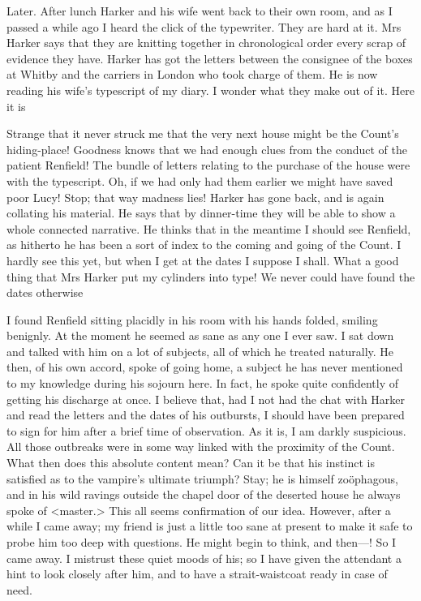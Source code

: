 \begin{diary}{Later.}
After lunch Harker and his wife went back to their own room, and as I passed a while ago I heard the click of the typewriter. They are hard at it. Mrs Harker says that they are knitting together in chronological order every scrap of evidence they have. Harker has got the letters between the consignee of the boxes at Whitby and the carriers in London who took charge of them. He is now reading his wife's typescript of my diary. I wonder what they make out of it. Here it is

Strange that it never struck me that the very next house might be the Count's hiding-place! Goodness knows that we had enough clues from the conduct of the patient Renfield! The bundle of letters relating to the purchase of the house were with the typescript. Oh, if we had only had them earlier we might have saved poor Lucy! Stop; that way madness lies! Harker has gone back, and is again collating his material. He says that by dinner-time they will be able to show a whole connected narrative. He thinks that in the meantime I should see Renfield, as hitherto he has been a sort of index to the coming and going of the Count. I hardly see this yet, but when I get at the dates I suppose I shall. What a good thing that Mrs Harker put my cylinders into type! We never could have found the dates otherwise

I found Renfield sitting placidly in his room with his hands folded, smiling benignly. At the moment he seemed as sane as any one I ever saw. I sat down and talked with him on a lot of subjects, all of which he treated naturally. He then, of his own accord, spoke of going home, a subject he has never mentioned to my knowledge during his sojourn here. In fact, he spoke quite confidently of getting his discharge at once. I believe that, had I not had the chat with Harker and read the letters and the dates of his outbursts, I should have been prepared to sign for him after a brief time of observation. As it is, I am darkly suspicious. All those outbreaks were in some way linked with the proximity of the Count. What then does this absolute content mean? Can it be that his instinct is satisfied as to the vampire's ultimate triumph? Stay; he is himself zoöphagous, and in his wild ravings outside the chapel door of the deserted house he always spoke of <master.> This all seems confirmation of our idea. However, after a while I came away; my friend is just a little too sane at present to make it safe to probe him too deep with questions. He might begin to think, and then—! So I came away. I mistrust these quiet moods of his; so I have given the attendant a hint to look closely after him, and to have a strait-waistcoat ready in case of need.
\end{diary}

